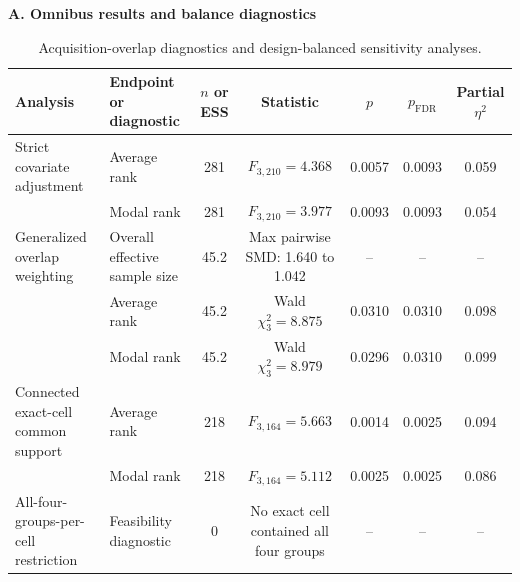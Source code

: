 \documentclass{article}
\providecommand{\DIFaddtex}[1]{{\protect\color{blue}#1}} %
\providecommand{\DIFaddFL}[1]{\DIFadd{#1}} %
\providecommand{\DIFadd}[1]{\texorpdfstring{\DIFaddtex{#1}}{#1}} %
\begin{document}
\begin{table}[!htbp]
\color{blue}
\centering
\caption{\DIFaddFL{Acquisition-overlap diagnostics and design-balanced sensitivity analyses.}}
\label{tab:acquisition_overlap}
\footnotesize
\setlength{\tabcolsep}{3pt}
\DIFaddFL{\textbf{A. Omnibus results and balance diagnostics}}\par\vspace{1mm}
\begin{tabularx}{\textwidth}{@{}>{\raggedright\arraybackslash}p{}>{\raggedright\arraybackslash}Xccccc@{}}
\toprule
\DIFaddFL{Analysis }& \DIFaddFL{Endpoint or diagnostic }& \DIFaddFL{$n$ or ESS }& \DIFaddFL{Statistic }& \DIFaddFL{$p$ }& \DIFaddFL{$p_{\mathrm{FDR}}$ }& \DIFaddFL{Partial $\eta^2$}\\
\midrule
\DIFaddFL{Strict covariate adjustment }& \DIFaddFL{Average rank }& \DIFaddFL{281 }& \DIFaddFL{$F_{3,210}=4.368$ }& \DIFaddFL{0.0057 }& \DIFaddFL{0.0093 }& \DIFaddFL{0.059}\\
& \DIFaddFL{Modal rank }& \DIFaddFL{281 }& \DIFaddFL{$F_{3,210}=3.977$ }& \DIFaddFL{0.0093 }& \DIFaddFL{0.0093 }& \DIFaddFL{0.054}\\
\addlinespace
\DIFaddFL{Generalized overlap weighting }& \DIFaddFL{Overall effective sample size }& \DIFaddFL{45.2 }& \DIFaddFL{Max pairwise SMD: 1.640 to 1.042 }& \DIFaddFL{-- }& \DIFaddFL{-- }& \DIFaddFL{--}\\
& \DIFaddFL{Average rank }& \DIFaddFL{45.2 }& \DIFaddFL{Wald $\chi^2_3=8.875$ }& \DIFaddFL{0.0310 }& \DIFaddFL{0.0310 }& \DIFaddFL{0.098}\\
& \DIFaddFL{Modal rank }& \DIFaddFL{45.2 }& \DIFaddFL{Wald $\chi^2_3=8.979$ }& \DIFaddFL{0.0296 }& \DIFaddFL{0.0310 }& \DIFaddFL{0.099}\\
\addlinespace
\DIFaddFL{Connected exact-cell common support }& \DIFaddFL{Average rank }& \DIFaddFL{218 }& \DIFaddFL{$F_{3,164}=5.663$ }& \DIFaddFL{0.0014 }& \DIFaddFL{0.0025 }& \DIFaddFL{0.094}\\
& \DIFaddFL{Modal rank }& \DIFaddFL{218 }& \DIFaddFL{$F_{3,164}=5.112$ }& \DIFaddFL{0.0025 }& \DIFaddFL{0.0025 }& \DIFaddFL{0.086}\\
\addlinespace
\DIFaddFL{All-four-groups-per-cell restriction }& \DIFaddFL{Feasibility diagnostic }& \DIFaddFL{0 }& \DIFaddFL{No exact cell contained all four groups }& \DIFaddFL{-- }& \DIFaddFL{-- }& \DIFaddFL{--}\\
\bottomrule
\end{tabularx}
\par\vspace{3mm}

\end{table}
\end{document}
